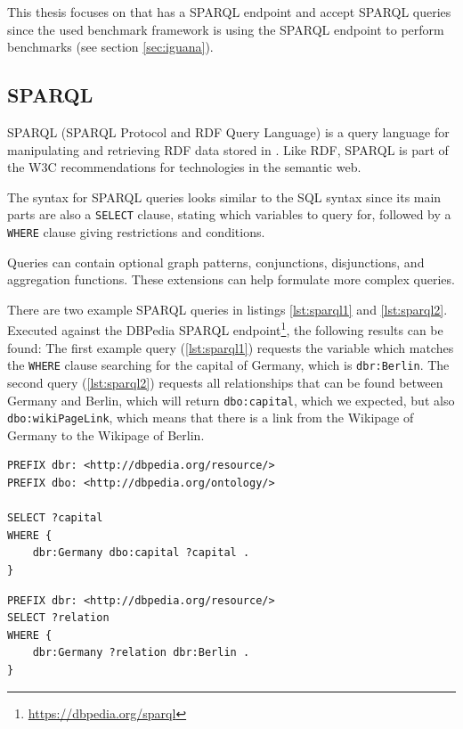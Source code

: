 This thesis focuses on \tsp{} that has a SPARQL endpoint and accept SPARQL queries since the used benchmark framework \iguana{} is using the SPARQL endpoint to perform benchmarks (see section \ref{sec:iguana}).


\subsection{SPARQL}
\label{sec:sparql}
SPARQL (SPARQL Protocol and RDF Query Language) \cite{harrisSPARQLQueryLanguage} is a query language for manipulating and retrieving RDF data stored in \tsp{}.
Like RDF, SPARQL is part of the W3C recommendations for technologies in the semantic web.

The syntax for SPARQL queries looks similar to the SQL syntax since its main parts are also a \texttt{SELECT} clause, stating which variables to query for, followed by a \texttt{WHERE} clause giving restrictions and conditions.

Queries can contain optional graph patterns, conjunctions, disjunctions, and aggregation functions.
These extensions can help formulate more complex queries.

There are two example SPARQL queries in listings \ref{lst:sparql1} and \ref{lst:sparql2}.
Executed against the DBPedia SPARQL endpoint\footnote{\url{https://dbpedia.org/sparql}}, the following results can be found:
The first example query (\ref{lst:sparql1}) requests the variable which matches the \texttt{WHERE} clause searching for the capital of Germany, which is \texttt{dbr:Berlin}.
The second query (\ref{lst:sparql2}) requests all relationships that can be found between Germany and Berlin, which will return \texttt{dbo:capital}, which we expected, but also \texttt{dbo:wikiPageLink}, which means that there is a link from the Wikipage of Germany to the Wikipage of Berlin.

\begin{lstlisting}[caption={SPARQL query searching the capital of Germany}, label=lst:sparql1]
PREFIX dbr: <http://dbpedia.org/resource/>
PREFIX dbo: <http://dbpedia.org/ontology/>

SELECT ?capital
WHERE {
	dbr:Germany dbo:capital ?capital .
}
\end{lstlisting}

\begin{lstlisting}[caption={SPARQL query searching all relations between Germany and Berlin}, label=lst:sparql2]
PREFIX dbr: <http://dbpedia.org/resource/>
SELECT ?relation
WHERE {
	dbr:Germany ?relation dbr:Berlin .
}
\end{lstlisting}
